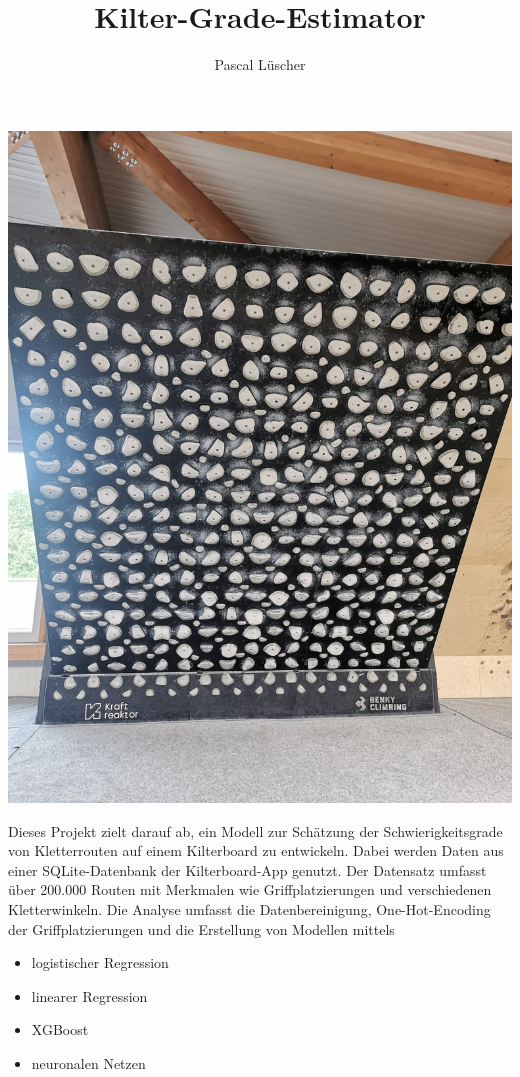 \documentclass{article}
\title{Kilter-Grade-Estimator}
\author{Pascal Lüscher}
\date{}
\begin{document}
\maketitle

\begin{minipage}[t]{0.45\textwidth}
    \includegraphics[width=.8\textwidth]{./media/Kilter_Board.jpg}    
\end{minipage}
\hfill
\begin{minipage}[t]{0.45\textwidth}
    \resizebox{\textwidth}{!}{}
\end{minipage}



Dieses Projekt zielt darauf ab, ein Modell zur Schätzung der Schwierigkeitsgrade von Kletterrouten auf einem Kilterboard zu entwickeln.
Dabei werden Daten aus einer SQLite-Datenbank der Kilterboard-App genutzt.
Der Datensatz umfasst über 200.000 Routen mit Merkmalen wie Griffplatzierungen und verschiedenen Kletterwinkeln. 
Die Analyse umfasst die Datenbereinigung, One-Hot-Encoding der Griffplatzierungen und die Erstellung von Modellen mittels 

\begin{itemize}
\item logistischer Regression
\item linearer Regression
\item XGBoost
\item neuronalen Netzen
\end{itemize}
\end{document}
